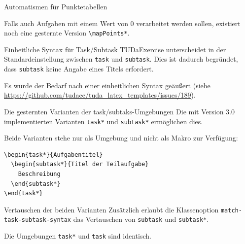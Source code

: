 \documentclass[
	ngerman,
	points=true,%
	]{tudaexercise}
\let\code\texttt
\let\tbs\textbackslash
\begin{document}
\begin{task}[points=auto]{Automatismen für Punktetabellen}
\begin{subtask}[points=3,title=Automatische Punktetabellen]
	Falls auch Aufgaben mit einem Wert von 0 verarbeitet werden sollen, existiert noch eine gesternte Version \code{\tbs{}mapPoints*}.
	\end{subtask}
\end{task}



\begin{task*}{Einheitliche Syntax für Task/Subtask}
	\label{task-subtask-syntax}
	TUDaExercise unterscheidet in der Standardeinstellung zwischen \code{task} und \code{subtask}. Dies ist dadurch begründet, dass \code{subtask} keine Angabe eines Titels erfordert.
	
	Es wurde der Bedarf nach einer einheitlichen Syntax geäußert (siehe \url{https://github.com/tudace/tuda_latex_templates/issues/189}). 
	
	\begin{subtask*}{Die gesternten Varianten der task/subtaks-Umgebungen}
		Die mit Version 3.0 implementierten Varianten \code{task*} und \code{subtask*} ermöglichen dies.
		
		Beide Varianten stehe nur als Umgebung und nicht als Makro zur Verfügung:

\begin{verbatim}
\begin{task*}{Aufgabentitel}
  \begin{subtask*}{Titel der Teilaufgabe}
    Beschreibung
  \end{subtask*}
\end{task*}
\end{verbatim}

\end{subtask*}

\begin{subtask*}{Vertauschen der beiden Varianten}
Zusätzlich erlaubt die Klassenoption \code{match-task-subtask-syntax} das Vertauschen von \code{subtask} und \code{subtask*}.

Die Umgebungen \code{task*} und \code{task} sind identisch.
\end{subtask*}
\end{task*}
\end{document}
